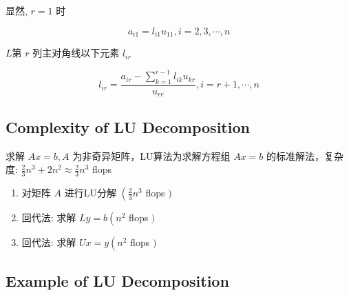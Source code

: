 \begin{corollary}
    显然, $ r=1 $ 时

    $$ a_{i 1}=l_{i 1} u_{11} , i=2,3, \cdots, n $$
\end{corollary}

\begin{corollary}
    $L$第 $ r $ 列主对角线以下元素 $ l_{i r} $

    $$ l_{i r}=\frac{a_{i r}-\sum_{k=1}^{r-1} l_{i k} u_{k r}}{u_{r r}}, i = r + 1, \cdots, n $$
\end{corollary}






\subsection{Complexity of LU Decomposition}

求解 $ A x=b, A $ 为非奇异矩阵，LU算法为求解方程组 $ A x=b $ 的标准解法，复杂度: $ \frac{2}{3} n^{3}+2 n^{2} \approx \frac{2}{3} n^{3} $ flops

\begin{enumerate}
    \item 对矩阵 $ A $ 进行LU分解 $ \left(\frac{2}{3} n^{3}\right. $ flops $ ) $
    \item 回代法: 求解 $ L y=b\left(n^{2}\right. $ flops $ ) $
    \item 回代法: 求解 $ U x=y\left(n^{2}\right. $ flops $ ) $
\end{enumerate}


\subsection{Example of LU Decomposition}

